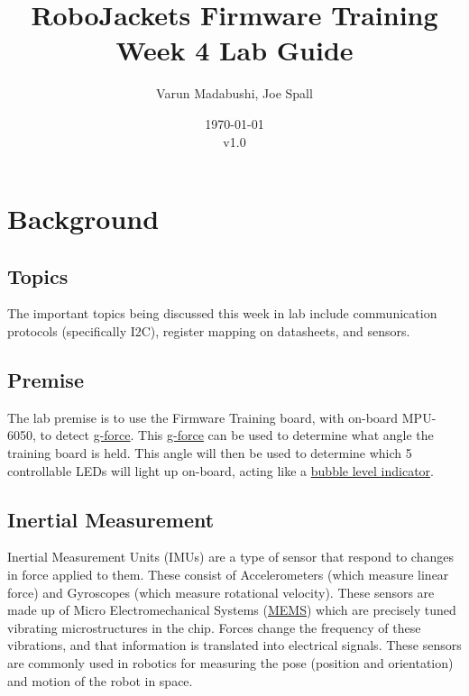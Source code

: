 \documentclass{article}
\title{RoboJackets Firmware Training Week 4 Lab Guide}
\author{Varun Madabushi, Joe Spall}
\date{\today\\v1.0}
\begin{document}
\maketitle{}
\setcounter{tocdepth}{2}
\tableofcontents
\pagebreak


\section{Background}
    \subsection{Topics}
        The important topics being discussed this week in lab include communication protocols (specifically I2C), register mapping on datasheets, and sensors.
    \subsection{Premise}
        The lab premise is to use the Firmware Training board, with on-board MPU-6050, to detect \href{https://en.wikipedia.org/wiki/G-force}{g-force}. This \href{https://upload.wikimedia.org/wikipedia/en/f/f5/G-Force_poster.jpg}{g-force} can be used to determine what angle the training board is held. This angle will then be used to determine which 5 controllable LEDs will light up on-board, acting like a \href{https://en.wikipedia.org/wiki/Spirit_level}{bubble level indicator}.
    \subsection{Inertial Measurement}
        Inertial Measurement Units (IMUs) are a type of sensor that respond to changes in force applied to them.  These consist of Accelerometers (which measure linear force) and Gyroscopes (which measure rotational velocity). These sensors are made up of Micro Electromechanical Systems (\href{https://en.wikipedia.org/wiki/Microelectromechanical_systems}{MEMS}) which are precisely tuned vibrating microstructures in the chip. Forces change the frequency of these vibrations, and that information is translated into electrical signals. These sensors are commonly used in robotics for measuring the pose (position and orientation) and motion of the robot in space.
        
\end{document}
